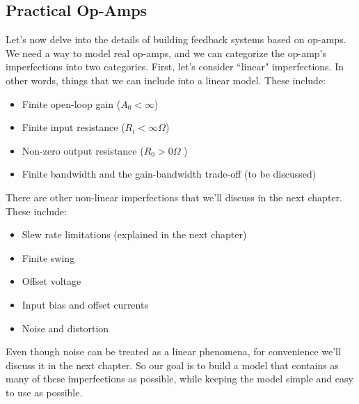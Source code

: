 \subsection{Practical Op-Amps}
Let's now delve into the details of building feedback systems based on op-amps.  We need a way to model real op-amps, and we can categorize the op-amp's imperfections into two categories.  First, let's consider ``linear" imperfections. In other words, things that we can include into a linear model.  These include:
\begin{itemize}
	\item  Finite open-loop gain ($A_0 < \infty$)
	\item  Finite input resistance ($R_i < \infty\Omega$)
 	\item Non-zero output resistance ($R_0 > 0\Omega$ )
 	\item Finite bandwidth and the gain-bandwidth trade-off (to be discussed) 
\end{itemize}
There are other non-linear imperfections that we'll discuss in the next chapter.  These include:
\begin{itemize}
\item Slew rate limitations (explained in the next chapter)
\item Finite swing
\item Offset voltage
\item Input bias and offset currents
\item Noise and distortion
\end{itemize}
Even though noise can be treated as a linear phenomena, for convenience we'll discuss it in the next chapter.  So our goal is to build a model that contains as many of these imperfections as possible, while keeping the model simple and easy to use as possible.
